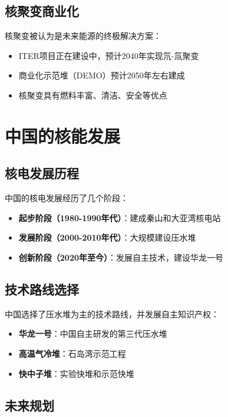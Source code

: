 \documentclass[12pt,UTF8]{ctexbook}
\begin{document}
\section{核聚变商业化}

核聚变被认为是未来能源的终极解决方案：

\begin{itemize}[leftmargin=2cm]
    \item ITER项目正在建设中，预计2040年实现氘-氚聚变
    \item 商业化示范堆（DEMO）预计2050年左右建成
    \item 核聚变具有燃料丰富、清洁、安全等优点
\end{itemize}

\chapter{中国的核能发展}

\section{核电发展历程}

中国的核电发展经历了几个阶段：

\begin{itemize}[leftmargin=2cm]
    \item \textbf{起步阶段（1980-1990年代）}：建成秦山和大亚湾核电站
    \item \textbf{发展阶段（2000-2010年代）}：大规模建设压水堆
    \item \textbf{创新阶段（2020年至今）}：发展自主技术，建设华龙一号
\end{itemize}

\section{技术路线选择}

中国选择了压水堆为主的技术路线，并发展自主知识产权：

\begin{itemize}[leftmargin=2cm]
    \item \textbf{华龙一号}：中国自主研发的第三代压水堆
    \item \textbf{高温气冷堆}：石岛湾示范工程
    \item \textbf{快中子堆}：实验快堆和示范快堆
\end{itemize}

\section{未来规划}
\end{document}
